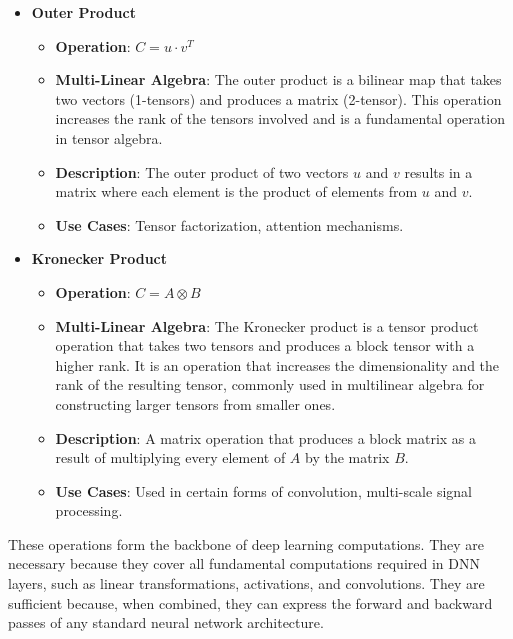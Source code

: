 \documentclass{article}
\begin{document}
\begin{itemize}
\item \textbf{Outer Product}
    \begin{itemize}
        \item \textbf{Operation}: \( C = u \cdot v^T \)
        \item \textbf{Multi-Linear Algebra}: The outer product is a bilinear map that takes two vectors (1-tensors) and produces a matrix (2-tensor). This operation increases the rank of the tensors involved and is a fundamental operation in tensor algebra.
        \item \textbf{Description}: The outer product of two vectors \(u\) and \(v\) results in a matrix where each element is the product of elements from \(u\) and \(v\).
        \item \textbf{Use Cases}: Tensor factorization, attention mechanisms.
    \end{itemize}

\item \textbf{Kronecker Product}
    \begin{itemize}
        \item \textbf{Operation}: \( C = A \otimes B \)
        \item \textbf{Multi-Linear Algebra}: The Kronecker product is a tensor product operation that takes two tensors and produces a block tensor with a higher rank. It is an operation that increases the dimensionality and the rank of the resulting tensor, commonly used in multilinear algebra for constructing larger tensors from smaller ones.
        \item \textbf{Description}: A matrix operation that produces a block matrix as a result of multiplying every element of \(A\) by the matrix \(B\).
        \item \textbf{Use Cases}: Used in certain forms of convolution, multi-scale signal processing.
    \end{itemize}
\end{itemize}

These operations form the backbone of deep learning computations. They are necessary because they cover all fundamental computations required in DNN layers, such as linear transformations, activations, and convolutions. They are sufficient because, when combined, they can express the forward and backward passes of any standard neural network architecture.
\end{document}
